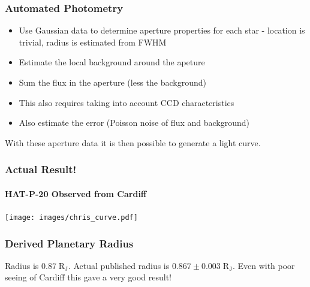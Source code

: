 \documentclass{beamer}
\begin{document}
  \begin{frame}
  \frametitle{Automated Photometry}
  \begin{itemize}
  \item Use Gaussian data to determine aperture properties for each star - location is trivial, radius is estimated from FWHM
  \item Estimate the local background around the apeture
  \item Sum the flux in the aperture (less the background)
  \item This also requires taking into account CCD characteristics
  \item Also estimate the error (Poisson noise of flux and background)
  \end{itemize}
  With these aperture data it is then possible to generate a light curve.
  \end{frame}
  \begin{frame}
  \frametitle{Actual Result!}
  \framesubtitle{HAT-P-20 Observed from Cardiff}
  \begin{center}
        \texttt{[image: images/chris\_curve.pdf]}
  \end{center}
  \end{frame}
  \begin{frame}
    \frametitle{Derived Planetary Radius}
    Radius is $0.87\;\mathrm{R_J}$. Actual published radius is $0.867\pm0.003\;\mathrm{R_J}$. Even with poor seeing of Cardiff this gave a very good result!
  \end{frame}
\end{document}
